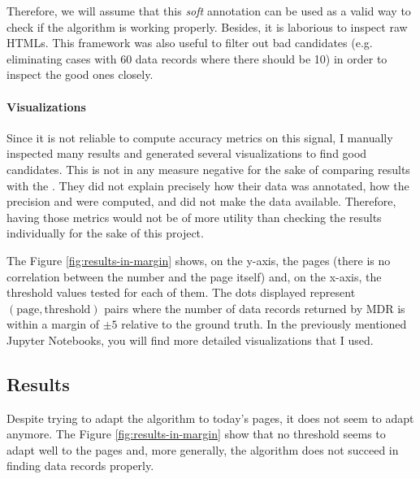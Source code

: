 \documentclass[10pt]{article}
\begin{document}

Therefore, we will assume that this \emph{soft} annotation can be used as a valid way to check if the algorithm is working properly. Besides, it is laborious to inspect raw HTMLs. This framework was also useful to filter out bad candidates (e.g. eliminating cases with 60 data records where there should be 10) in order to inspect the good ones closely.


\paragraph{Visualizations} 

Since it is not reliable to compute accuracy metrics on this signal, I manually inspected many results and generated several visualizations to find good candidates. This is not in any measure negative for the sake of comparing results with the \cite{mdr}. They did not explain precisely how their data was annotated, how the precision and were computed, and did not make the data available. Therefore, having those metrics would not be of more utility than checking the results individually for the sake of this project. 

The Figure \ref{fig:results-in-margin} shows, on the y-axis, the pages (there is no correlation between the number and the page itself) and, on the x-axis, the threshold values tested for each of them. The dots displayed represent $(\text{page}, \text{threshold})$ pairs where the number of data records returned by MDR is within a margin of $\pm 5$ relative to the ground truth. In the previously mentioned Jupyter Notebooks, you will find more detailed visualizations that I used.



\subsection{Results}

Despite trying to adapt the algorithm to today's pages, it does not seem to adapt anymore. The Figure \ref{fig:results-in-margin} show that no threshold seems to adapt well to the pages and, more generally, the algorithm does not succeed in finding data records properly.
\end{document}
